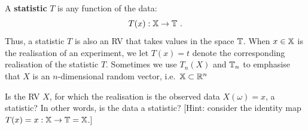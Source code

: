 \begin{definition}[Statistic]\label{D:Statistic}
A {\bf statistic} $T$ is any 
function of the data:
\[
T(x) : \mathbb{X} \to \mathbb{T} \ .
\]
Thus, a statistic $T$ is also an RV that takes values in the space $\mathbb{T}$.  When $x \in \mathbb{X}$ is the realisation of an experiment, we let $T(x)=t$ denote the corresponding realisation of the statistic $T$. Sometimes we use $T_n(X)$ and $\mathbb{T}_n$ to emphasise that $X$ is an $n$-dimensional random vector, i.e.~$\mathbb{X} \subset \mathbb{R}^n$ 
\end{definition}

\begin{classwork}
Is the RV $X$, for which the realisation is the observed data $X(\omega)=x$, a statistic?  In other words, is the data a statistic? [Hint: consider the identity map $T(x)=x: \mathbb{X} \to \mathbb{T}=\mathbb{X}$.]
\end{classwork}

